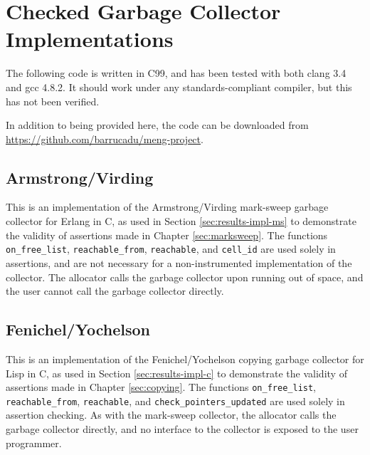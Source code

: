 \chapter{Checked Garbage Collector Implementations}
\label{sec:gc-impl}

\lstset{language=C}

The following code is written in C99, and has been tested with both
clang 3.4 and gcc 4.8.2. It should work under any standards-compliant
compiler, but this has not been verified.

In addition to being provided here, the code can be downloaded from
\url{https://github.com/barrucadu/meng-project}.

\section{Armstrong/Virding}
\label{sec:gc-impl-armstrong-virding}

This is an implementation of the Armstrong/Virding\cite{Armstrong95}
mark-sweep garbage collector for Erlang in C, as used in Section
\ref{sec:results-impl-ms} to demonstrate the validity of assertions
made in Chapter \ref{sec:marksweep}. The functions
\texttt{on\_free\_list}, \texttt{reachable\_from}, \texttt{reachable},
and \texttt{cell\_id} are used solely in assertions, and are not
necessary for a non-instrumented implementation of the collector. The
allocator calls the garbage collector upon running out of space, and
the user cannot call the garbage collector directly.

\lstset{label=lst:armstrong-virding-c}


\lstset{label=lst:armstrong-virding-h}


\section{Fenichel/Yochelson}
\label{sec:gc-impl-fenichel-yochelson}

This is an implementation of the Fenichel/Yochelson\cite{Fenichel69}
copying garbage collector for Lisp in C, as used in Section
\ref{sec:results-impl-c} to demonstrate the validity of assertions
made in Chapter \ref{sec:copying}. The functions
\texttt{on\_free\_list}, \texttt{reachable\_from}, \texttt{reachable},
and \texttt{check\_pointers\_updated} are used solely in assertion
checking. As with the mark-sweep collector, the allocator calls the
garbage collector directly, and no interface to the collector is
exposed to the user programmer.

